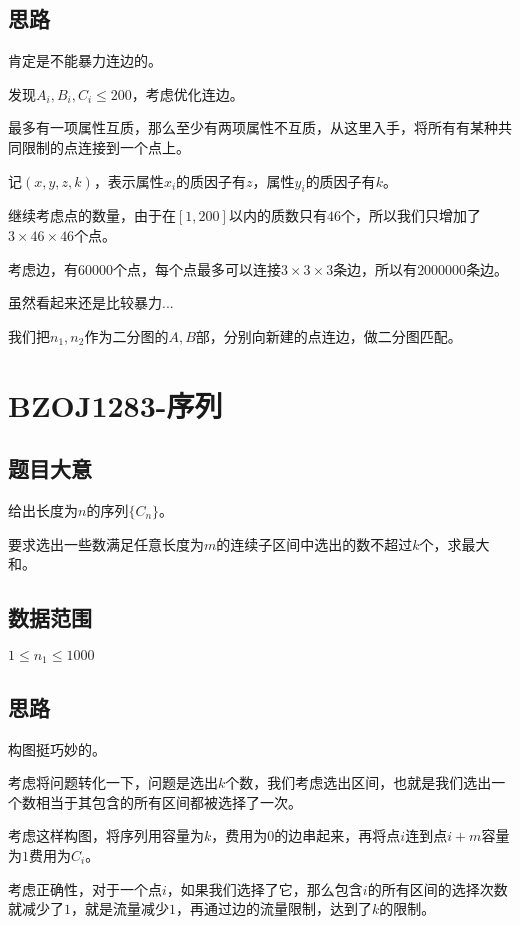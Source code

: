 \documentclass{ctexart}
\numberwithin{equation}{section}
\begin{document}
\begin{flushleft}
  \subsection{思路}
  肯定是不能暴力连边的。

  发现$A_i,B_i,C_i\le 200$，考虑优化连边。

  最多有一项属性互质，那么至少有两项属性不互质，从这里入手，将所有有某种共同限制的点连接到一个点上。

  记$(x,y,z,k)$，表示属性$x_i$的质因子有$z$，属性$y_i$的质因子有$k$。

  继续考虑点的数量，由于在$[1,200]$以内的质数只有$46$个，所以我们只增加了$3\times 46\times 46$个点。

  考虑边，有$60000$个点，每个点最多可以连接$3\times 3\times3$条边，所以有$2000000$条边。

  虽然看起来还是比较暴力...

  我们把$n_1,n_2$作为二分图的$A,B$部，分别向新建的点连边，做二分图匹配。
  
  \newpage

  \section{BZOJ1283-序列}
  \subsection{题目大意}
  给出长度为$n$的序列$\{C_n\}$。

  要求选出一些数满足任意长度为$m$的连续子区间中选出的数不超过$k$个，求最大和。
  
  
    
  \subsection{数据范围}
  $1\le n_1 \le 1000$
  \subsection{思路}
  构图挺巧妙的。

  考虑将问题转化一下，问题是选出$k$个数，我们考虑选出区间，也就是我们选出一个数相当于其包含的所有区间都被选择了一次。

  考虑这样构图，将序列用容量为$k$，费用为$0$的边串起来，再将点$i$连到点$i+m$容量为$1$费用为$C_i$。

  考虑正确性，对于一个点$i$，如果我们选择了它，那么包含$i$的所有区间的选择次数就减少了$1$，就是流量减少$1$，再通过边的流量限制，达到了$k$的限制。
  

\end{flushleft}
\end{document}
